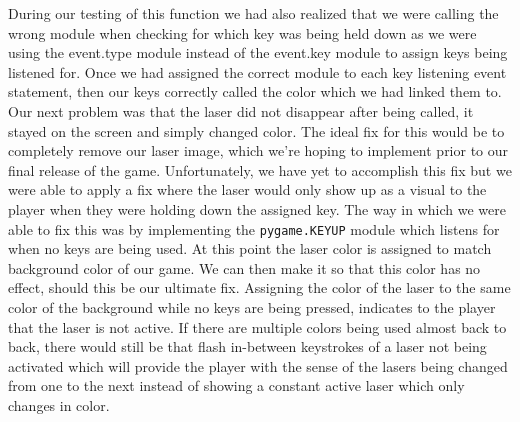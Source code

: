 During our testing of this function we had also realized that we
were calling the wrong module when checking for which key was being
held down as we were using the event.type module instead of the
event.key module to assign keys being listened for. Once we had
assigned the correct module to each key listening event statement,
then our keys correctly called the color which we had linked them
to. Our next problem was that the laser did not disappear after
being called, it stayed on the screen and simply changed color. The
ideal fix for this would be to completely remove our laser image,
which we’re hoping to implement prior to our final release of the
game. Unfortunately, we have yet to accomplish this fix but we were
able to apply a fix where the laser would only show up as a visual
to the player when they were holding down the assigned key. The way
in which we were able to fix this was by implementing the
\texttt{pygame.KEYUP} module which listens for when no
keys are being used.  At this point the laser color is assigned to
match background color of our game. We can then make it so that this
color has no effect, should this be our ultimate fix. Assigning the
color of the laser to the same color of the background while no keys
are being pressed, indicates to the player that the laser is not
active. If there are multiple colors being used almost back to back,
there would still be that flash in-between keystrokes of a laser not
being activated which will provide the player with the sense of the
lasers being changed from one to the next instead of showing a
constant active laser which only changes in color.
